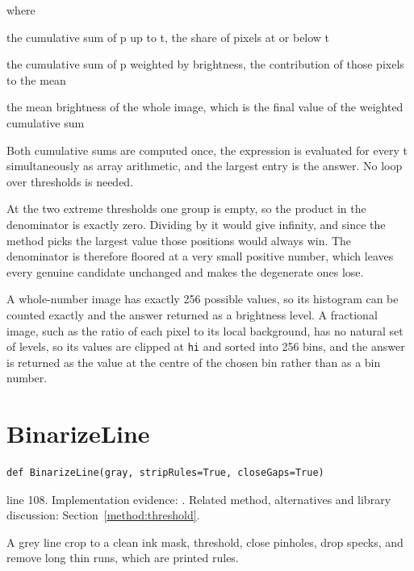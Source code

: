 \noindent where
\begin{description}[leftmargin=2.4em,style=nextline,font=\normalfont\ttfamily]\setlength\itemsep{1pt}
  \item[{$\omega(t)$}] \normalfont the cumulative sum of p up to t, the share of pixels at or below t
  \item[{$\mu(t)$}] \normalfont the cumulative sum of p weighted by brightness, the contribution of those pixels to the mean
  \item[{$\mu_T$}] \normalfont the mean brightness of the whole image, which is the final value of the weighted cumulative sum
\end{description}
Both cumulative sums are computed once, the expression is evaluated for every t simultaneously as array arithmetic, and the largest entry is the answer. No loop over thresholds is needed.


At the two extreme thresholds one group is empty, so the product in the denominator is exactly zero. Dividing by it would give infinity, and since the method picks the largest value those positions would always win. The denominator is therefore floored at a very small positive number, which leaves every genuine candidate unchanged and makes the degenerate ones lose.


A whole-number image has exactly 256 possible values, so its histogram can be counted exactly and the answer returned as a brightness level. A fractional image, such as the ratio of each pixel to its local background, has no natural set of levels, so its values are clipped at \texttt{hi} and sorted into 256 bins, and the answer is returned as the value at the centre of the chosen bin rather than as a bin number.



\section{BinarizeLine}\label{fn:segment:BinarizeLine}
\begin{lstlisting}[style=sig]
def BinarizeLine(gray, stripRules=True, closeGaps=True)
\end{lstlisting}
 line 108. Implementation evidence: \cite{code2026}. Related method, alternatives and library discussion: Section~\ref{method:threshold}.


A grey line crop to a clean ink mask, threshold, close pinholes, drop specks, and remove long thin runs, which are printed rules.




